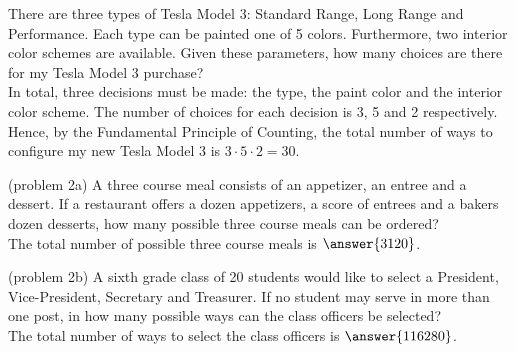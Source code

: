\documentclass[handout]{ximera}
\begin{document}
\begin{example}[example 2]
There are three types of Tesla Model 3: Standard Range, Long Range and Performance. 
Each type can be painted one of 5 colors. Furthermore, two interior color schemes are available. 
Given these parameters, how many choices are there for my Tesla Model 3 purchase?\\
In total, three decisions must be made: the type, the paint color and the interior color scheme.
The number of choices for each decision is 3, 5 and 2 respectively. 
Hence, by the Fundamental Principle of Counting, the total number of ways to configure my new 
Tesla Model 3 is $3 \cdot 5\cdot 2 = 30$.
\begin{image}
\end{image}
\end{example}


\begin{problem}(problem 2a)
A three course meal consists of an appetizer, an entree and a dessert. 
If a restaurant offers a dozen appetizers, a score of entrees and a bakers dozen desserts, 
how many possible three course meals can be ordered?\\
The total number of possible three course meals is $\answer{3120}$.
\end{problem}

\begin{problem}(problem 2b)
A sixth grade class of 20 students would like to select a President, Vice-President, Secretary and Treasurer.
If no student may serve in more than one post, in how many possible ways can the class officers be selected?\\
The total number of ways to select the class officers is $\answer{116280}$.
\end{problem}
\end{document}
